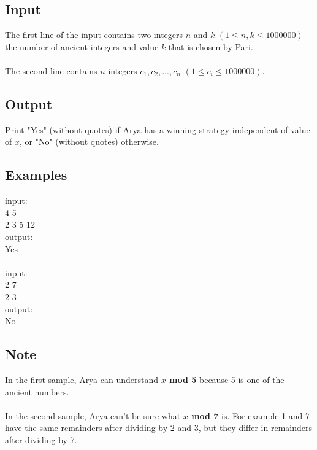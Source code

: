 \documentclass[10pt,a4paper]{article}
\begin{document}
\subsection*{Input}
The first line of the input contains two integers $n$ and $k$ $(1 \leq n, k \leq 1000000)$ - the number of ancient integers and value $k$ that is chosen by Pari.
\\ \\
The second line contains $n$ integers $c_1,c_2,...,c_n$ $(1 \leq c_i \leq 1000000)$.

\subsection*{Output}
Print "Yes" (without quotes) if Arya has a winning strategy independent of value of $x$, or "No" (without quotes) otherwise.

\subsection*{Examples}
input: \\
4 5 \\
2 3 5 12 
\\
output: \\
Yes 
\\ \\
input: \\
2 7 \\
2 3 \\
output: \\
No 

\subsection*{Note}
In the first sample, Arya can understand \textbf{$x$ mod 5} because 5 is one of the ancient numbers.
\\ \\
In the second sample, Arya can't be sure what \textbf{$x$ mod 7} is. For example 1 and 7 have the same remainders after dividing by 2 and 3, but they differ in remainders after dividing by 7.
\end{document}
